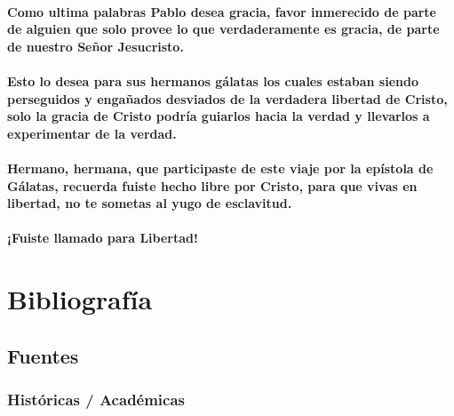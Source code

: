 \documentclass[11a pt,twoside]{article}
\let\oldsection\section
\renewcommand{\section}{\needspace{6\baselineskip}\oldsection}
\let\oldsubsection\subsection
\renewcommand{\subsection}{\needspace{5\baselineskip}\oldsubsection}
\let\oldsubsubsection\subsubsection
\renewcommand{\subsubsection}{\needspace{4\baselineskip}\oldsubsubsection}
\let\oldparagraph\paragraph
\renewcommand{\paragraph}{\needspace{3\baselineskip}\oldparagraph}
\begin{document}
\paragraph{Como ultima palabras Pablo desea gracia, favor inmerecido de
parte de alguien que solo provee lo que verdaderamente es gracia, de
parte de nuestro Señor
Jesucristo.}\label{como-ultima-palabras-pablo-desea-gracia-favor-inmerecido-de-parte-de-alguien-que-solo-provee-lo-que-verdaderamente-es-gracia-de-parte-de-nuestro-seuxf1or-jesucristo.}

\paragraph{Esto lo desea para sus hermanos gálatas los cuales estaban
siendo perseguidos y engañados desviados de la verdadera libertad de
Cristo, solo la gracia de Cristo podría guiarlos hacia la verdad y
llevarlos a experimentar de la
verdad.}\label{esto-lo-desea-para-sus-hermanos-guxe1latas-los-cuales-estaban-siendo-perseguidos-y-engauxf1ados-desviados-de-la-verdadera-libertad-de-cristo-solo-la-gracia-de-cristo-podruxeda-guiarlos-hacia-la-verdad-y-llevarlos-a-experimentar-de-la-verdad.}

\paragraph{Hermano, hermana, que participaste de este viaje por la
epístola de Gálatas, recuerda fuiste hecho libre por Cristo, para que
vivas en libertad, no te sometas al yugo de
esclavitud.}\label{hermano-hermana-que-participaste-de-este-viaje-por-la-epuxedstola-de-guxe1latas-recuerda-fuiste-hecho-libre-por-cristo-para-que-vivas-en-libertad-no-te-sometas-al-yugo-de-esclavitud.}

\paragraph{¡Fuiste llamado para
Libertad!}\label{fuiste-llamado-para-libertad}

\section{Bibliografía}\label{bibliografuxeda}

\subsection{Fuentes}\label{fuentes}

\subsubsection{Históricas /
Académicas}\label{histuxf3ricas-acaduxe9micas}
\end{document}
